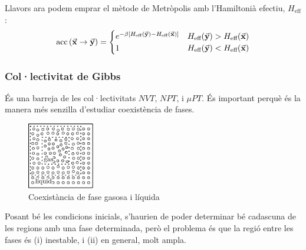 Llavors ara podem emprar el mètode de Metròpolis amb l'Hamiltonià efectiu, $H_{\text{eff}}$:
\begin{align}
	\operatorname{acc}\qty(\va{x} \to \va{y}) =
	\begin{cases}
		e^{- \beta \qty[H_{\text{eff}}(\va{y}) - H_{\text{eff}}(\va{x})]} & H_{\text{eff}}(\va{y}) > H_{\text{eff}}(\va{x}) \\
		1 & H_{\text{eff}}(\va{y}) < H_{\text{eff}}(\va{x})
	\end{cases}
\end{align}

\subsubsection*{Col·lectivitat de Gibbs}
És una barreja de les col·lectivitats $NVT$, $NPT$, i $\mu PT$. És important perquè és la manera més senzilla d'estudiar coexistència de fases.
\begin{figure}[H]
	\centering
	\includegraphics[width=0.26\textwidth]{./images/col-gibbs}
	\caption{Coexistància de fase gasosa i líquida}
	\label{fig:col-gibbs}
\end{figure}

Posant bé les condicions inicials, s'haurien de poder determinar bé cadascuna de les regions amb una fase determinada, però el problema és que la regió entre les fases és (i) inestable, i (ii) en general, molt ampla.

